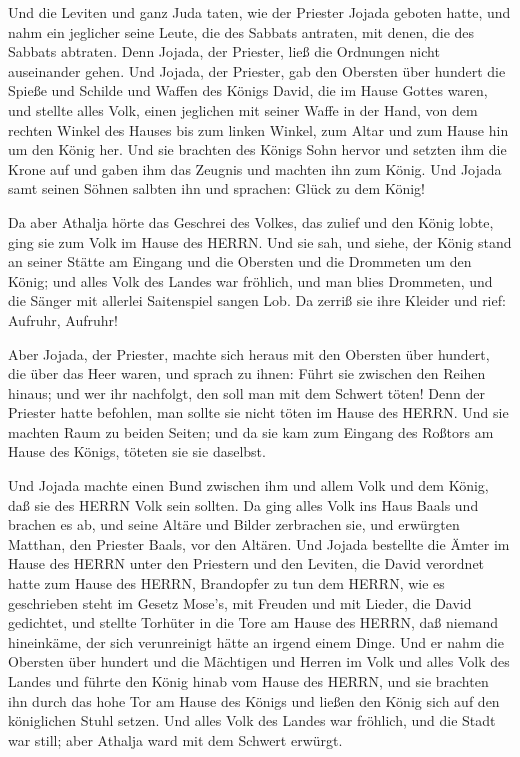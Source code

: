  Und die Leviten und ganz Juda taten, wie der Priester
Jojada geboten hatte, und nahm ein jeglicher seine Leute, die des
Sabbats antraten, mit denen, die des Sabbats abtraten. Denn Jojada, der
Priester, ließ die Ordnungen nicht auseinander gehen.  Und
Jojada, der Priester, gab den Obersten über hundert die Spieße und
Schilde und Waffen des Königs David, die im Hause Gottes waren,
 und stellte alles Volk, einen jeglichen mit seiner Waffe
in der Hand, von dem rechten Winkel des Hauses bis zum linken Winkel,
zum Altar und zum Hause hin um den König her.  Und sie
brachten des Königs Sohn hervor und setzten ihm die Krone auf und gaben
ihm das Zeugnis und machten ihn zum König. Und Jojada samt seinen Söhnen
salbten ihn und sprachen: Glück zu dem König!

 Da aber Athalja hörte das Geschrei des Volkes, das zulief
und den König lobte, ging sie zum Volk im Hause des HERRN. 
Und sie sah, und siehe, der König stand an seiner Stätte am Eingang und
die Obersten und die Drommeten um den König; und alles Volk des Landes
war fröhlich, und man blies Drommeten, und die Sänger mit allerlei
Saitenspiel sangen Lob. Da zerriß sie ihre Kleider und rief: Aufruhr,
Aufruhr!

 Aber Jojada, der Priester, machte sich heraus mit den
Obersten über hundert, die über das Heer waren, und sprach zu ihnen:
Führt sie zwischen den Reihen hinaus; und wer ihr nachfolgt, den soll
man mit dem Schwert töten! Denn der Priester hatte befohlen, man sollte
sie nicht töten im Hause des HERRN.  Und sie machten Raum
zu beiden Seiten; und da sie kam zum Eingang des Roßtors am Hause des
Königs, töteten sie sie daselbst.

 Und Jojada machte einen Bund zwischen ihm und allem Volk
und dem König, daß sie des HERRN Volk sein sollten.  Da
ging alles Volk ins Haus Baals und brachen es ab, und seine Altäre und
Bilder zerbrachen sie, und erwürgten Matthan, den Priester Baals, vor
den Altären.  Und Jojada bestellte die Ämter im Hause des
HERRN unter den Priestern und den Leviten, die David verordnet hatte zum
Hause des HERRN, Brandopfer zu tun dem HERRN, wie es geschrieben steht
im Gesetz Mose's, mit Freuden und mit Lieder, die David gedichtet,
 und stellte Torhüter in die Tore am Hause des HERRN, daß
niemand hineinkäme, der sich verunreinigt hätte an irgend einem Dinge.
 Und er nahm die Obersten über hundert und die Mächtigen
und Herren im Volk und alles Volk des Landes und führte den König hinab
vom Hause des HERRN, und sie brachten ihn durch das hohe Tor am Hause
des Königs und ließen den König sich auf den königlichen Stuhl setzen.
 Und alles Volk des Landes war fröhlich, und die Stadt war
still; aber Athalja ward mit dem Schwert erwürgt.

